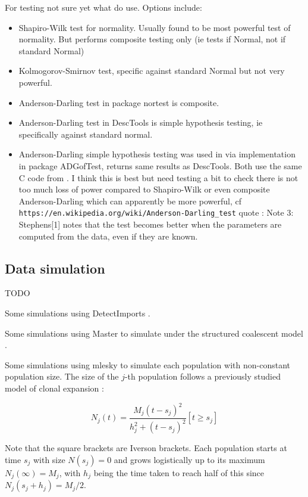 \documentclass{article}
\begin{document}
For testing not sure yet what do use. Options include:
\begin{itemize}
\item Shapiro-Wilk test for normality. Usually found to be most powerful test of normality.
But performs composite testing only (ie tests if Normal, not if standard Normal)
\item Kolmogorov-Smirnov test, specific against standard Normal but not very powerful.
\item Anderson-Darling test \citep{lewis1961distribution} in package nortest is composite.
\item Anderson-Darling test in DescTools is simple hypothesis testing, ie specifically
against standard normal.   
\item Anderson-Darling simple hypothesis testing was used in \citep{lauNewModelDiagnostics2014} via implementation in package ADGofTest, returns same results as DescTools. Both use the same C code from \citep{marsagliaEvaluatingAndersonDarlingDistribution2004}. I think this is best but need testing a bit to check there is not too much loss of power compared to Shapiro-Wilk or even composite Anderson-Darling which can apparently be more powerful, cf 
\verb+https://en.wikipedia.org/wiki/Anderson-Darling_test+ quote :
Note 3: Stephens[1] notes that the test becomes better when the parameters are computed from the data, even if they are known.

\end{itemize}

\subsection*{Data simulation}

TODO

Some simulations using DetectImports \citep{Didelot2022detectimports}.

Some simulations using Master \citep{Vaughan2013} to simulate under the structured coalescent model \citep{Nordborg1997}.

Some simulations using mlesky \citep{Didelot2023mlesky} to simulate each population with non-constant population size. The size of the $j$-th population follows a previously studied model of clonal expansion \citep{Helekal2021}:

\begin{equation}
N_j(t)=\frac{M_j(t-s_j)^2}{h_j^2+(t-s_j)^2}[t \geq s_j]
\end{equation}

Note that the square brackets are Iverson brackets. Each population starts at time $s_j$ with size $N(s_j)=0$ and grows logistically up to its maximum $N_j(\infty)=M_j$, with $h_j$ being the time taken to reach half of this since $N_j(s_j+h_j)=M_j/2$. 
\end{document}
